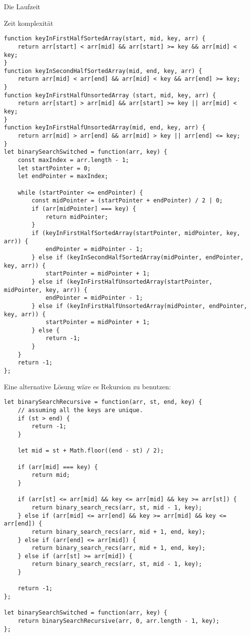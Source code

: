 \documentclass[babel]{book}
\begin{document}
Die Laufzeit

Zeit komplexität

\begin{lstlisting}[caption=My Javascript Example]
function keyInFirstHalfSortedArray(start, mid, key, arr) {
	return arr[start] < arr[mid] && arr[start] >= key && arr[mid] < key;
}
function keyInSecondHalfSortedArray(mid, end, key, arr) {
	return arr[mid] < arr[end] && arr[mid] < key && arr[end] >= key;
}
function keyInFirstHalfUnsortedArray (start, mid, key, arr) {
	return arr[start] > arr[mid] && arr[start] >= key || arr[mid] < key;
}
function keyInFirstHalfUnsortedArray(mid, end, key, arr) {
	return arr[mid] > arr[end] && arr[mid] > key || arr[end] <= key;
}
let binarySearchSwitched = function(arr, key) {
	const maxIndex = arr.length - 1;
	let startPointer = 0;
	let endPointer = maxIndex;

	while (startPointer <= endPointer) {
		const midPointer = (startPointer + endPointer) / 2 | 0;
		if (arr[midPointer] === key) {
			return midPointer;
		}
		if (keyInFirstHalfSortedArray(startPointer, midPointer, key, arr)) {
			endPointer = midPointer - 1;
		} else if (keyInSecondHalfSortedArray(midPointer, endPointer, key, arr)) {
			startPointer = midPointer + 1;
		} else if (keyInFirstHalfUnsortedArray(startPointer, midPointer, key, arr)) {
			endPointer = midPointer - 1;
		} else if (keyInFirstHalfUnsortedArray(midPointer, endPointer, key, arr)) {
			startPointer = midPointer + 1;
		} else {
			return -1;
		}
	}
	return -1;
};
\end{lstlisting}

Eine alternative Lösung wäre es Rekursion zu benutzen:
\begin{lstlisting}[caption=My Javascript Example]
let binarySearchRecursive = function(arr, st, end, key) {
	// assuming all the keys are unique.
	if (st > end) {
		return -1;
	}
	
	let mid = st + Math.floor((end - st) / 2);
	
	if (arr[mid] === key) {
		return mid;
	}
	
	if (arr[st] <= arr[mid] && key <= arr[mid] && key >= arr[st]) {
		return binary_search_recs(arr, st, mid - 1, key);
	} else if (arr[mid] <= arr[end] && key >= arr[mid] && key <= arr[end]) {
		return binary_search_recs(arr, mid + 1, end, key);
	} else if (arr[end] <= arr[mid]) {
		return binary_search_recs(arr, mid + 1, end, key);
	} else if (arr[st] >= arr[mid]) {
		return binary_search_recs(arr, st, mid - 1, key);
	} 
	
	return -1;
};

let binarySearchSwitched = function(arr, key) {
	return binarySearchRecursive(arr, 0, arr.length - 1, key);
};
\end{lstlisting}
\end{document}
